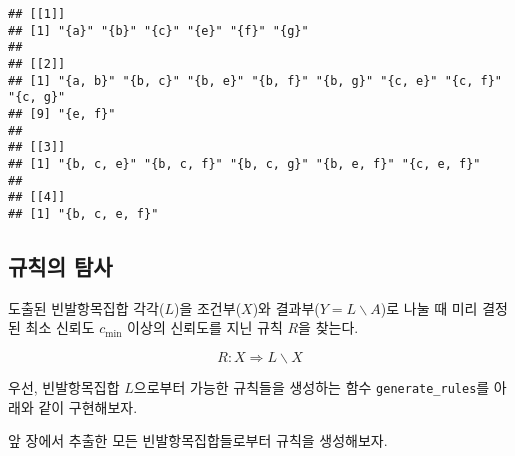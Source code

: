 \documentclass[]{book}
\newenvironment{Shaded}{\begin{snugshade}}{\end{snugshade}}
\newcommand{\CommentTok}[1]{\textcolor[rgb]{0.56,0.35,0.01}{\textit{#1}}}
\newcommand{\ControlFlowTok}[1]{\textcolor[rgb]{0.13,0.29,0.53}{\textbf{#1}}}
\newcommand{\DataTypeTok}[1]{\textcolor[rgb]{0.13,0.29,0.53}{#1}}
\newcommand{\DecValTok}[1]{\textcolor[rgb]{0.00,0.00,0.81}{#1}}
\newcommand{\KeywordTok}[1]{\textcolor[rgb]{0.13,0.29,0.53}{\textbf{#1}}}
\newcommand{\NormalTok}[1]{#1}
\newcommand{\OperatorTok}[1]{\textcolor[rgb]{0.81,0.36,0.00}{\textbf{#1}}}
\newcommand{\OtherTok}[1]{\textcolor[rgb]{0.56,0.35,0.01}{#1}}
\newcommand{\StringTok}[1]{\textcolor[rgb]{0.31,0.60,0.02}{#1}}
\begin{document}
\begin{verbatim}
## [[1]]
## [1] "{a}" "{b}" "{c}" "{e}" "{f}" "{g}"
## 
## [[2]]
## [1] "{a, b}" "{b, c}" "{b, e}" "{b, f}" "{b, g}" "{c, e}" "{c, f}" "{c, g}"
## [9] "{e, f}"
## 
## [[3]]
## [1] "{b, c, e}" "{b, c, f}" "{b, c, g}" "{b, e, f}" "{c, e, f}"
## 
## [[4]]
## [1] "{b, c, e, f}"
\end{verbatim}

\hypertarget{apriori-rule-exploration}{%
\subsection{규칙의 탐사}\label{apriori-rule-exploration}}

도출된 빈발항목집합 각각(\(L\))을 조건부(\(X\))와 결과부(\(Y = L \backslash A\))로 나눌 때 미리 결정된 최소 신뢰도 \(c_{\text{min}}\) 이상의 신뢰도를 지닌 규칙 \(R\)을 찾는다.

\begin{equation*}
R: X \Rightarrow L \backslash X
\end{equation*}

우선, 빈발항목집합 \(L\)으로부터 가능한 규칙들을 생성하는 함수 \texttt{generate\_rules}를 아래와 같이 구현해보자.

\begin{Shaded}
\end{Shaded}

앞 장에서 추출한 모든 빈발항목집합들로부터 규칙을 생성해보자.
\end{document}
